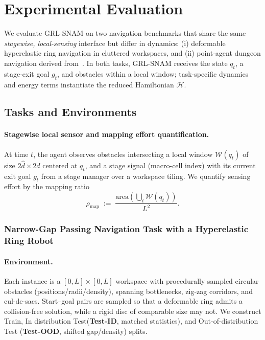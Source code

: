\section{Experimental Evaluation}
\label{sec:experiments}

We evaluate GRL-SNAM on two navigation benchmarks that share the same \emph{stagewise, local-sensing} interface but differ in dynamics: (i) deformable hyperelastic ring navigation in cluttered workspaces, and (ii) point-agent dungeon navigation derived from~\citet{liang2023context}. In both tasks, GRL-SNAM receives the state $q_t$, a stage-exit goal $g_t$, and obstacles within a local window; task-specific dynamics and energy terms instantiate the reduced Hamiltonian $\mathcal{H}$.

\subsection{Tasks and Environments}
\label{subsec:tasks}

\paragraph{Stagewise local sensor and mapping effort quantification.}
At time $t$, the agent observes obstacles intersecting a local window $\mathcal{W}(q_t)$ of size $2\hat d \times 2\hat d$ centered at $q_t$, and a stage signal (macro-cell index) with its current exit goal $g_t$ from a stage manager over a workspace tiling. We quantify sensing effort by the mapping ratio
\begin{equation}
\rho_{\mathrm{map}} \;:=\; \frac{\mathrm{area}\!\left(\bigcup_t \mathcal{W}(q_t)\right)}{L^2}.
\label{eq:mapping_ratio}
\end{equation}

\subsubsection{ Narrow-Gap Passing Navigation Task with a Hyperelastic Ring Robot}
\label{subsubsec:ring_task}

\paragraph{Environment.}
Each instance is a $[0,L]\times[0,L]$ workspace with procedurally sampled circular obstacles (positions/radii/density), spanning bottlenecks, zig-zag corridors, and cul-de-sacs. Start--goal pairs are sampled so that a deformable ring admits a collision-free solution, while a rigid disc of comparable size may not. We construct Train, {In distribution Test(\textbf{Test-ID}, matched statistics), and Out-of-distribution Test (\textbf{Test-OOD}, shifted gap/density) splits}.

